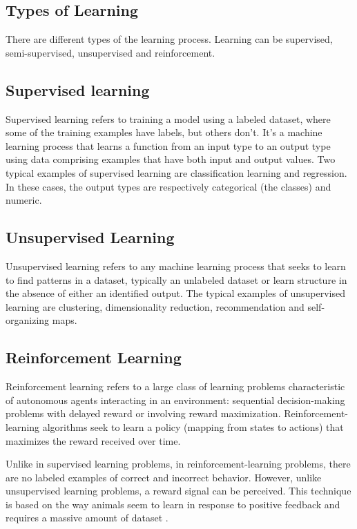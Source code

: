 \subsection{Types of Learning}

There are different types of the learning process. Learning can be supervised, semi-supervised, unsupervised and reinforcement.

\subsection*{Supervised learning}

Supervised learning \cite{sammut2011encyclopedia} refers to training a model using a labeled dataset, where some of the training examples have labels, but others don’t. It's a machine learning process that learns a function from an input type to an output type using data comprising examples that have both input and output values. Two typical examples of supervised learning are classification learning and regression. In these cases, the output types are respectively categorical (the classes) and numeric. 

\subsection*{Unsupervised Learning}

Unsupervised learning \cite{sammut2011encyclopedia} refers to any machine learning process that seeks to learn to find patterns in a dataset, typically an unlabeled dataset or learn structure in the absence of either an identified output. The typical examples of unsupervised learning are clustering, dimensionality reduction, recommendation and self-organizing maps.

\subsection*{Reinforcement Learning}

Reinforcement learning \cite{sammut2011encyclopedia} refers to a large class of learning problems characteristic of autonomous agents interacting in an environment: sequential decision-making problems with delayed reward or involving reward maximization. Reinforcement-learning algorithms seek to learn a policy (mapping from states to actions) that maximizes the reward received over time.

Unlike in supervised learning problems, in reinforcement-learning problems, there are no labeled examples of correct and incorrect behavior. However, unlike unsupervised learning problems, a reward signal can be perceived. This technique is based on the way animals seem to learn in response to positive feedback and requires a massive amount of dataset \cite{sammut2011encyclopedia}.

